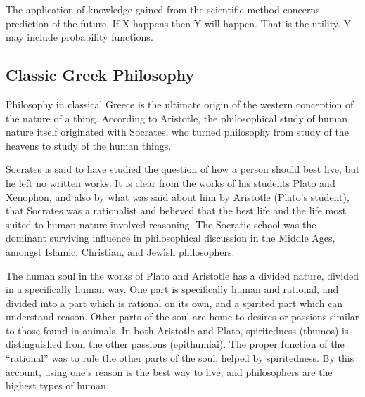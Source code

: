 The application of knowledge gained from the scientific method concerns prediction of the future. If X happens then Y will happen. That is the utility. Y may include probability functions.

\subsection{Classic Greek Philosophy}

Philosophy in classical Greece is the ultimate origin of the western conception of the nature of a thing. According to Aristotle, the philosophical study of human nature itself originated with Socrates, who turned philosophy from study of the heavens to study of the human things.

Socrates is said to have studied the question of how a person should best live, but he left no written works. It is clear from the works of his students Plato and Xenophon, and also by what was said about him by Aristotle (Plato’s student), that Socrates was a rationalist and believed that the best life and the life most suited to human nature involved reasoning. The Socratic school was the dominant surviving influence in philosophical discussion in the Middle Ages, amongst Islamic, Christian, and Jewish philosophers.

The human soul in the works of Plato and Aristotle has a divided nature, divided in a specifically human way. One part is specifically human and rational, and divided into a part which is rational on its own, and a spirited part which can understand reason. Other parts of the soul are home to desires or passions similar to those found in animals. In both Aristotle and Plato, spiritedness (thumos) is distinguished from the other passions (epithumiai). The proper function of the ``rational'' was to rule the other parts of the soul, helped by spiritedness. By this account, using one’s reason is the best way to live, and philosophers are the highest types of human.

